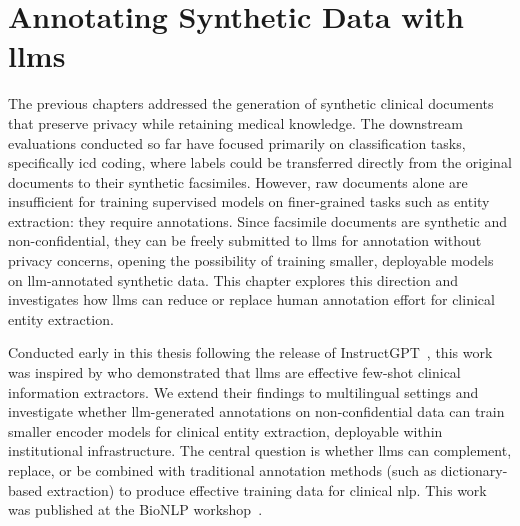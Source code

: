\chapter{Annotating Synthetic Data with \glspl{llm}}
\label{chap:distillation}

The previous chapters addressed the generation of synthetic clinical documents that preserve privacy while retaining medical knowledge.
The downstream evaluations conducted so far have focused primarily on classification tasks, specifically \gls{icd} coding, where labels could be transferred directly from the original documents to their synthetic facsimiles.
However, raw documents alone are insufficient for training supervised models on finer-grained tasks such as entity extraction: they require annotations.
Since facsimile documents are synthetic and non-confidential, they can be freely submitted to \glspl{llm} for annotation without privacy concerns, opening the possibility of training smaller, deployable models on \gls{llm}-annotated synthetic data.
This chapter explores this direction and investigates how \glspl{llm} can reduce or replace human annotation effort for clinical entity extraction.

Conducted early in this thesis following the release of InstructGPT~\citep{ouyang2022training}, this work was inspired by \citet{Agrawal2022LargeExtractors} who demonstrated that \glspl{llm} are effective few-shot clinical information extractors.
We extend their findings to multilingual settings and investigate whether \gls{llm}-generated annotations on non-confidential data can train smaller encoder models for clinical entity extraction, deployable within institutional infrastructure.
The central question is whether \glspl{llm} can complement, replace, or be combined with traditional annotation methods (such as dictionary-based extraction) to produce effective training data for clinical \gls{nlp}.
This work was published at the BioNLP workshop~\citep{meoni2023large}.

\minitoc

